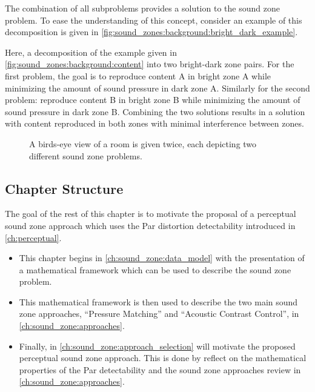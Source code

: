 The combination of all subproblems provides a solution to the sound zone problem. 
To ease the understanding of this concept, consider an example of this decomposition is given in 
\autoref{fig:sound_zones:background:bright_dark_example}.

Here, a decomposition of the example given in \autoref{fig:sound_zones:background:content} into 
two bright-dark zone pairs.
For the first problem, the goal is to reproduce content A in bright zone A while minimizing 
the amount of sound pressure in dark zone A.
Similarly for the second problem: reproduce content B in bright zone B while minimizing the 
amount of sound pressure in dark zone B.
Combining the two solutions results in a solution with content reproduced in both zones with 
minimal interference between zones.

\begin{figure}[]
    \centering
    \begin{subfigure}{0.49\linewidth}
        \centering
        \scalebox{0.9}{}
    \end{subfigure}
    \begin{subfigure}{0.49\linewidth}
        \centering
        \scalebox{0.9}{}
    \end{subfigure}
    \caption{A birds-eye view of a room is given twice, each depicting two different sound zone problems.}
    \label{fig:sound_zones:background:bright_dark_example}
\end{figure}

\subsection*{Chapter Structure}
The goal of the rest of this chapter is to motivate the proposal of a perceptual sound zone approach which uses
the Par distortion detectability introduced in \autoref{ch:perceptual}.
\begin{itemize}
    \item This chapter begins in \autoref{ch:sound_zone:data_model} with the presentation of  
a mathematical framework which can be used to describe the sound zone problem.
    \item This mathematical framework is then used to describe the two main sound zone approaches, ``Pressure Matching'' and ``Acoustic Contrast Control'', 
in \autoref{ch:sound_zone:approaches}.
    \item Finally, in \autoref{ch:sound_zone:approach_selection} will motivate the proposed perceptual sound zone approach.
This is done by reflect on the mathematical properties of the Par detectability and the sound zone approaches review in \autoref{ch:sound_zone:approaches}.
\end{itemize}
